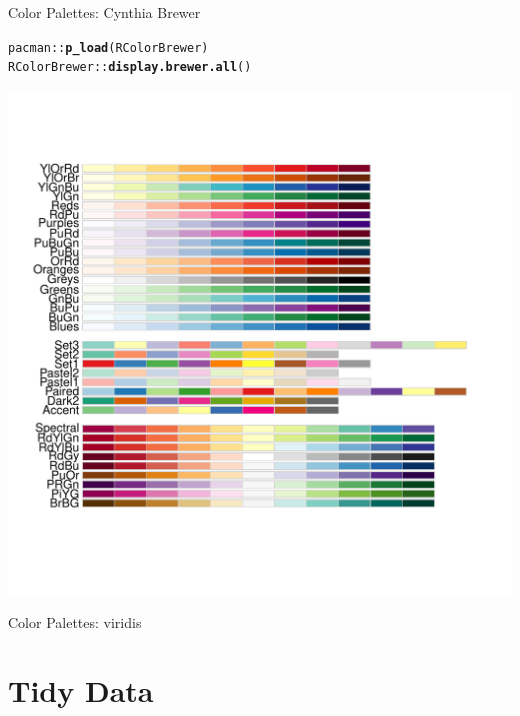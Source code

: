 \documentclass[10pt]{beamer}\usepackage[]{graphicx}\usepackage[]{color}
\makeatletter
\def\maxwidth{ %
  \ifdim\Gin@nat@width>\linewidth
    \linewidth
  \else
    \Gin@nat@width
  \fi
}
\newcommand{\hlopt}[1]{\textcolor[rgb]{0,0,0}{#1}}%
\newcommand{\hlstd}[1]{\textcolor[rgb]{0.345,0.345,0.345}{#1}}%
\newcommand{\hlkwd}[1]{\textcolor[rgb]{0.737,0.353,0.396}{\textbf{#1}}}%
\newenvironment{kframe}{%
 \def\at@end@of@kframe{}%
 \ifinner\ifhmode%
  \def\at@end@of@kframe{\end{minipage}}%
  \begin{minipage}{\columnwidth}%
 \fi\fi%
 \def\FrameCommand##1{\hskip\@totalleftmargin \hskip-\fboxsep
 \colorbox{shadecolor}{##1}\hskip-\fboxsep
     \hskip-\linewidth \hskip-\@totalleftmargin \hskip\columnwidth}%
 \MakeFramed {\advance\hsize-\width
   \@totalleftmargin\z@ \linewidth\hsize
   \@setminipage}}%
 {\par\unskip\endMakeFramed%
 \at@end@of@kframe}
\newenvironment{knitrout}{}{} %
\makeatother
\begin{document}
\begin{frame}[fragile]{Color Palettes: Cynthia Brewer}
	
\begin{knitrout}\tiny
{}\color{fgcolor}\begin{kframe}
\begin{alltt}
\hlstd{pacman}\hlopt{::}\hlkwd{p_load}\hlstd{(RColorBrewer)}
\hlstd{RColorBrewer}\hlopt{::}\hlkwd{display.brewer.all}\hlstd{()}
\end{alltt}
\end{kframe}

{\centering \includegraphics[width=\maxwidth]{figure/unnamed-chunk-5-1} 

}


\end{knitrout}
	
	
\end{frame}



\begin{frame}[fragile]{Color Palettes: viridis}
	
	
	
	
	
\end{frame}

\section{Tidy Data}
\end{document}
